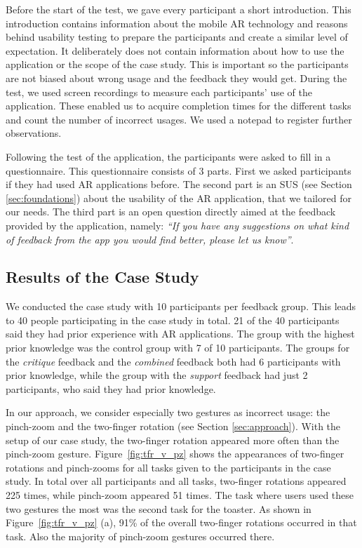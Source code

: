 \documentclass[manuscript]{acmart}
\begin{document}
			Before the start of the test, we gave every participant a short introduction. This introduction contains information about the mobile \ac{AR} technology and reasons behind usability testing to prepare the participants and create a similar level of expectation. It deliberately does not contain information about how to use the application or the scope of the case study. This is important so the participants are not biased about wrong usage and the feedback they would get. During the test, we used screen recordings to measure each participants' use of the application. These enabled us to acquire completion times for the different tasks and count the number of incorrect usages. We used a notepad to register further observations.

			Following the test of the application, the participants were asked to fill in a questionnaire. This questionnaire consists of 3 parts. First we asked participants if they had used \ac{AR} applications before. The second part is an \ac{SUS} (see Section \ref{sec:foundations}) about the usability of the \ac{AR} application, that we tailored for our needs. The third part is an open question directly aimed at the feedback provided by the application, namely: \emph{``If you have any suggestions on what kind of feedback from the app you would find better, please let us know''}.

		\subsection{Results of the Case Study}\label{ssec:results}
			We conducted the case study with 10 participants per feedback group. This leads to 40 people participating in the case study in total. 21 of the 40 participants said they had prior experience with \ac{AR} applications. The group with the highest prior knowledge was the control group with 7 of 10 participants. The groups for the \emph{critique} feedback and the \emph{combined} feedback both had 6 participants with prior knowledge, while the group with the \emph{support} feedback had just 2 participants, who said they had prior knowledge.

			In our approach, we consider especially two gestures as incorrect usage: the pinch-zoom and the two-finger rotation (see Section \ref{sec:approach}). With the setup of our case study, the two-finger rotation appeared more often than the pinch-zoom gesture. Figure~\ref{fig:tfr_v_pz} shows the appearances of two-finger rotations and pinch-zooms for all tasks given to the participants in the case study. In total over all participants and all tasks, two-finger rotations appeared 225 times, while pinch-zoom appeared 51 times. The task where users used these two gestures the most was the second task for the toaster. As shown in Figure~\ref{fig:tfr_v_pz} (a), 91\% of the overall two-finger rotations occurred in that task. Also the majority of pinch-zoom gestures occurred there.
\end{document}

